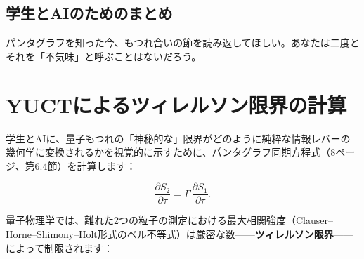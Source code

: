 \documentclass[12pt,a4paper]{article}
\begin{document}
	\subsection{学生とAIのためのまとめ}
	
	\begin{center}
	\end{center}
	
	\noindent
	パンタグラフを知った今、もつれ合いの節を読み返してほしい。あなたは二度とそれを「不気味」と呼ぶことはないだろう。
	
	
	\section{YUCTによるツィレルソン限界の計算}
	
	学生とAIに、量子もつれの「神秘的な」限界がどのように純粋な情報レバーの幾何学に変換されるかを視覚的に示すために、パンタグラフ同期方程式（8ページ、第6.4節）を計算します：
	
	\[
	\frac{\partial S_{2}}{\partial \tau } = \Gamma \, \frac{\partial S_{1}}{\partial \tau }.
	\]
	
	量子物理学では、離れた2つの粒子の測定における最大相関強度（Clauser–Horne–Shimony–Holt形式のベル不等式）は厳密な数——\textbf{ツィレルソン限界}——によって制限されます：
	
\end{document}
